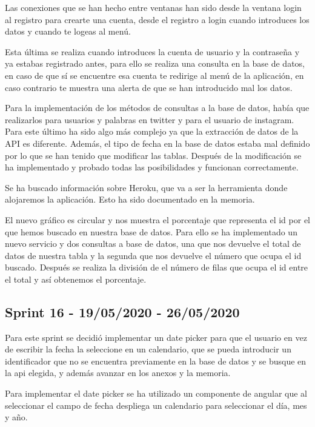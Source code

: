 Las conexiones que se han hecho entre ventanas han sido desde la ventana login al registro para crearte una cuenta, desde el registro a login cuando introduces los datos y cuando te logeas al menú.

Esta última se realiza cuando introduces la cuenta de usuario y la contraseña y ya estabas registrado antes, para ello se realiza una consulta en la base de datos, en caso de que sí se encuentre esa cuenta te redirige al menú de la aplicación, en caso contrario te muestra una alerta de que se han introducido mal los datos.

Para la implementación de los métodos de consultas a la base de datos, había que realizarlos para usuarios y palabras en twitter y para el usuario de instagram. Para este último ha sido algo más complejo ya que la extracción de datos de la API es diferente. Además, el tipo de fecha en la base de datos estaba mal definido por lo que se han tenido que modificar las tablas.
Después de la modificación se ha implementado y probado todas las posibilidades y funcionan correctamente.

Se ha buscado información sobre Heroku, que va a ser la herramienta donde alojaremos la aplicación. Esto ha sido documentado en la memoria.

El nuevo gráfico es circular y nos muestra el porcentaje que representa el id por el que hemos buscado en nuestra base de datos. Para ello se ha implementado un nuevo servicio y dos consultas a base de datos, una que nos devuelve el total de datos de nuestra tabla y la segunda que nos devuelve el número que ocupa el id buscado. Después se realiza la división de el número de filas que ocupa el id entre el total y así obtenemos el porcentaje.


\subsection{Sprint 16 - 19/05/2020 - 26/05/2020}
Para este sprint se decidió implementar un date picker para que el usuario en vez de escribir la fecha la seleccione en un calendario, que se pueda introducir un identificador que no se encuentra previamente en la base de datos y se busque en la api elegida, y además avanzar en los anexos y la memoria.

Para implementar el date picker se ha utilizado un componente de angular que al seleccionar el campo de fecha despliega un calendario para seleccionar el día, mes y año.

